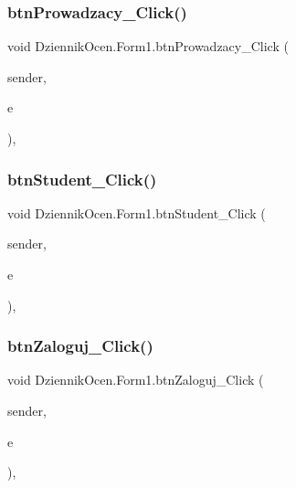 \subsubsection{\texorpdfstring{btn\+Prowadzacy\+\_\+\+Click()}{btnProwadzacy\_Click()}}
{\footnotesize\ttfamily void Dziennik\+Ocen.\+Form1.\+btn\+Prowadzacy\+\_\+\+Click (\begin{DoxyParamCaption}\item[{object}]{sender,  }\item[{Event\+Args}]{e }\end{DoxyParamCaption})\hspace{0.3cm}{\ttfamily [inline]}, {\ttfamily [private]}}

\mbox{\label{class_dziennik_ocen_1_1_form1_acb939aa086bb943e9720d95d9142ef88}} 
\subsubsection{\texorpdfstring{btn\+Student\+\_\+\+Click()}{btnStudent\_Click()}}
{\footnotesize\ttfamily void Dziennik\+Ocen.\+Form1.\+btn\+Student\+\_\+\+Click (\begin{DoxyParamCaption}\item[{object}]{sender,  }\item[{Event\+Args}]{e }\end{DoxyParamCaption})\hspace{0.3cm}{\ttfamily [inline]}, {\ttfamily [private]}}

\mbox{\label{class_dziennik_ocen_1_1_form1_a28adc07ca2d4d960f57b60cae2b1bad9}} 
\subsubsection{\texorpdfstring{btn\+Zaloguj\+\_\+\+Click()}{btnZaloguj\_Click()}}
{\footnotesize\ttfamily void Dziennik\+Ocen.\+Form1.\+btn\+Zaloguj\+\_\+\+Click (\begin{DoxyParamCaption}\item[{object}]{sender,  }\item[{Event\+Args}]{e }\end{DoxyParamCaption})\hspace{0.3cm}{\ttfamily [inline]}, {\ttfamily [private]}}

